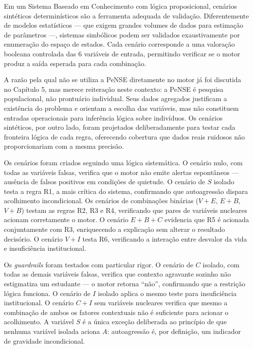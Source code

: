 \documentclass[
    12pt,
    openright,
    oneside,
    a4paper,
    english,
    brazil
]{abntex2}
\begin{document}
Em um Sistema Baseado em Conhecimento com l\'ogica proposicional, cen\'arios sint\'eticos determin\'isticos s\~ao a ferramenta adequada de valida\c{c}\~ao. Diferentemente de modelos estat\'isticos --- que exigem grandes volumes de dados para estima\c{c}\~ao de par\^ametros ---, sistemas simb\'olicos podem ser validados exaustivamente por enumera\c{c}\~ao do espa\c{c}o de estados. Cada cen\'ario corresponde a uma valora\c{c}\~ao booleana controlada das 6 vari\'aveis de entrada, permitindo verificar se o motor produz a sa\'ida esperada para cada combina\c{c}\~ao.

A raz\~ao pela qual n\~ao se utiliza a PeNSE diretamente no motor j\'a foi discutida no Cap\'itulo 5, mas merece reitera\c{c}\~ao neste contexto: a PeNSE \'e pesquisa populacional, n\~ao prontu\'ario individual. Seus dados agregados justificam a exist\^encia do problema e orientam a escolha das vari\'aveis, mas n\~ao constituem entradas operacionais para infer\^encia l\'ogica sobre indiv\'iduos. Os cen\'arios sint\'eticos, por outro lado, foram projetados deliberadamente para testar cada fronteira l\'ogica de cada regra, oferecendo cobertura que dados reais ruidosos n\~ao proporcionariam com a mesma precis\~ao.

Os cen\'arios foram criados seguindo uma l\'ogica sistem\'atica. O cen\'ario nulo, com todas as vari\'aveis falsas, verifica que o motor n\~ao emite alertas espont\^aneos --- aus\^encia de falsos positivos em condi\c{c}\~oes de quietude. O cen\'ario de $S$ isolado testa a regra R1, a mais cr\'itica do sistema, confirmando que autoagress\~ao dispara acolhimento incondicional. Os cen\'arios de combina\c{c}\~oes bin\'arias ($V+E$, $E+B$, $V+B$) testam as regras R2, R3 e R4, verificando que pares de vari\'aveis nucleares acionam corretamente o motor. O cen\'ario $E+B+C$ evidencia que R5 \'e acionada conjuntamente com R3, enriquecendo a explica\c{c}\~ao sem alterar o resultado decis\'orio. O cen\'ario $V+I$ testa R6, verificando a intera\c{c}\~ao entre desvalor da vida e insufici\^encia institucional.

Os \textit{guardrails} foram testados com particular rigor. O cen\'ario de $C$ isolado, com todas as demais vari\'aveis falsas, verifica que contexto agravante sozinho n\~ao estigmatiza um estudante --- o motor retorna ``n\~ao'', confirmando que a restri\c{c}\~ao l\'ogica funciona. O cen\'ario de $I$ isolado aplica o mesmo teste para insufici\^encia institucional. O cen\'ario $C+I$ sem vari\'aveis nucleares verifica que mesmo a combina\c{c}\~ao de ambos os fatores contextuais n\~ao \'e suficiente para acionar o acolhimento. A vari\'avel $S$ \'e a \'unica exce\c{c}\~ao deliberada ao princ\'ipio de que nenhuma vari\'avel isolada aciona $A$: autoagress\~ao \'e, por defini\c{c}\~ao, um indicador de gravidade incondicional.
\end{document}
